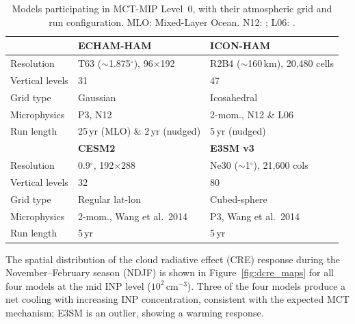 \begin{table}[h]
\centering
\footnotesize
\begin{tabular}{lll}
\hline
                   & \textbf{ECHAM-HAM}               & \textbf{ICON-HAM}               \\
\hline
Resolution         & T63 ($\sim$1.875$^\circ$), 96$\times$192  & R2B4 ($\sim$160\,km), 20{,}480 cells  \\
Vertical levels    & 31                                & 47                              \\
Grid type          & Gaussian                          & Icosahedral                     \\
Microphysics       & P3, N12                           & 2-mom., N12 \& L06              \\
Run length         & 25\,yr (MLO) \& 2\,yr (nudged)    & 5\,yr (nudged)                  \\
\hline
                   & \textbf{CESM2}                    & \textbf{E3SM v3}                \\
\hline
Resolution         & 0.9$^\circ$, 192$\times$288       & Ne30 ($\sim$1$^\circ$), 21{,}600 cols \\
Vertical levels    & 32                                & 80                              \\
Grid type          & Regular lat-lon                   & Cubed-sphere                    \\
Microphysics       & 2-mom., Wang et al.\ 2014         & P3, Wang et al.\ 2014           \\
Run length         & 5\,yr                             & 5\,yr                           \\
\hline
\end{tabular}
\caption{Models participating in MCT-MIP Level~0, with their atmospheric grid and run
configuration. MLO: Mixed-Layer Ocean. N12: \citet{Niemand2012}; L06: \citet{Lohmann2006}.}
\label{tab:mct_models}
\end{table}

The spatial distribution of the cloud radiative effect (CRE) response during
the November--February season (NDJF) is shown in
Figure~\ref{fig:dcre_maps} for all four models at the mid INP level
($10^2$\,cm$^{-3}$).
Three of the four models produce a net cooling with increasing INP
concentration, consistent with the expected MCT mechanism; E3SM is an outlier,
showing a warming response.

